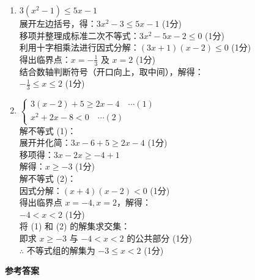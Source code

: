 \documentclass[12pt,a4paper]{exam-zh}
\begin{document}
\begin{solution}
    \begin{enumerate}[label=(\alph*)]
        \item $3(x^2 - 1) \le 5x - 1$ \\
        展开左边括号，得：$3x^2 - 3 \le 5x - 1$ \hfill (1分) \\
        移项并整理成标准二次不等式：$3x^2 - 5x - 2 \le 0$ \hfill (1分) \\
        利用十字相乘法进行因式分解：$(3x + 1)(x - 2) \le 0$ \hfill (1分) \\
        得出临界点：$x = -\frac{1}{3}$ 及 $x = 2$ \hfill (1分) \\
        结合数轴判断符号（开口向上，取中间），解得：\\
        $-\frac{1}{3} \le x \le 2$ \hfill (1分)

        \item $\begin{cases} 3(x - 2) + 5 \ge 2x - 4 \quad \cdots (1) \\ x^2 + 2x - 8 < 0 \quad \cdots (2) \end{cases}$ \\
        解不等式 (1)：\\
        展开并化简：$3x - 6 + 5 \ge 2x - 4$ \hfill (1分) \\
        移项得：$3x - 2x \ge -4 + 1$ \\
        解得：$x \ge -3$ \hfill (1分) \\
        解不等式 (2)：\\
        因式分解：$(x + 4)(x - 2) < 0$ \hfill (1分) \\
        得出临界点 $x = -4, x = 2$，解得：\\
        $-4 < x < 2$ \hfill (1分) \\
        将 (1) 和 (2) 的解集求交集：\\
        即求 $x \ge -3$ 与 $-4 < x < 2$ 的公共部分 \hfill (1分) \\
        $\therefore$ 不等式组的解集为 $-3 \le x < 2$ \hfill (1分)
    \end{enumerate}
\end{solution}

\newpage

\begin{center}
    {\Large\bfseries 参考答案\par}
\end{center}
\vspace{1em}
\end{document}
